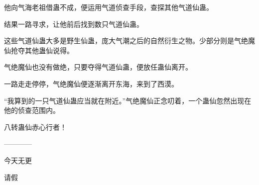 \begin{this_body}
他向气海老祖借蛊不成，便运用气道侦查手段，查探其他气道仙蛊。

结果一路寻求，让他前后找到数只气道仙蛊。

这些气道仙蛊大多是野生仙蛊，庞大气潮之后的自然衍生之物。少部分则是气绝魔仙抢夺其他蛊仙说得。

气绝魔仙也没有做绝，只要夺得气道仙蛊，便放任蛊仙离开。

一路走走停停，气绝魔仙便逐渐离开东海，来到了西漠。

“我算到的一只气道仙蛊应当就在附近。”气绝魔仙正念叨着，一个蛊仙忽然出现在他的侦查范围内。

八转蛊仙赤心行者！

------------

今天无更

请假

\end{this_body}

